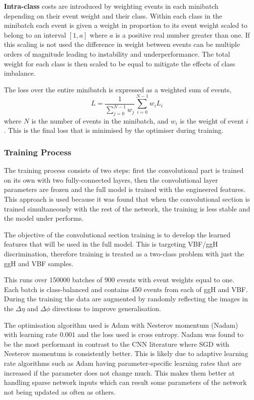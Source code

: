 \textbf{Intra-class} costs are introduced by weighting events in each minibatch depending on their event weight and their class.  
Within each class in the minibatch each event is given a weight in proportion to its event weight scaled to belong to an interval $[1,a]$ where $a$ is a positive real number greater than one. 
If this scaling is not used the difference in weight between events can be multiple orders of magnitude leading to instability and underperformance. 
The total weight for each class is then scaled to be equal to mitigate the effects of class imbalance. 

The loss over the entire minibatch is expressed as a weighted sum of events,
\begin{equation}
    L = \frac{1}{\sum_{j=0}^{N-1}w_{j}}\sum_{i=0}^{N-1}w_{i}L_{i}
\end{equation} 
where $N$ is the number of events in the minibatch, and $w_i$ is the weight of event $i$.
This is the final loss that is minimised by the optimiser during training. 



\subsubsection{Training Process}
The training process consists of two steps: first the convolutional part is trained on its own with two fully-connected layers, then the convolutional layer parameters are frozen and the full model is trained with the engineered features. This approach is used because it was found that when the convolutional section is trained simultaneously with the rest of the network, the training is less stable and the model under performs.

The objective of the convolutional section training is to develop the learned features that will be used in the full model. 
This is targeting VBF/ggH discrimination, therefore training is treated as a two-class problem with just the ggH and VBF samples.  

This runs over 150000 batches of 900 events with event weights equal to one. Each batch is class-balanced and contains 450 events from each of ggH and VBF.  
During the training the data are augmented by randomly reflecting the images in the $\Delta\eta$ and $\Delta\phi$ directions to improve generalisation. 

The optimisation algorithm used is Adam with Nesterov momentum (Nadam) with learning rate $0.001$ and the loss used is cross entropy. 
Nadam was found to be the most performant in contrast to the CNN literature where SGD with Nesterov momentum is consistently better. 
This is likely due to adaptive learning rate algorithms such as Adam having parameter-specific learning rates that are increased if the parameter does not change much. 
This makes them better at handling sparse network inputs which can result some parameters of the network not being updated as often as others. 



